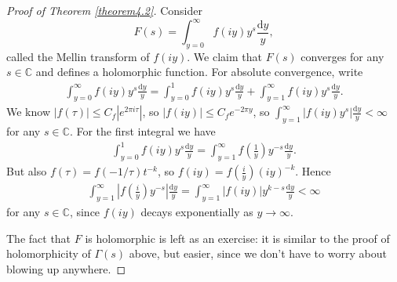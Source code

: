 \documentclass{article}
\theoremstyle{definition}
\begin{document}
\begin{proof}[Proof of Theorem \ref{theorem4.2}]
    Consider \[
    F(s) = \int_{y=0}^{\infty} f(iy)y^s\frac{\mathrm{d}y}{y},
    \]
    called the Mellin transform of $f(iy)$. We claim that $F(s)$ converges for any $s \in \mathbb{C}$ and defines a holomorphic function. For absolute convergence, write
    \begin{align*}
        \int_{y=0}^{\infty} f(iy)y^s\frac{\mathrm{d}y}{y} = \int_{y=0}^{1} f(iy)y^s \frac{\mathrm{d}y}{y} + \int_{y=1}^{\infty} f(iy)y^s \frac{\mathrm{d}y}{y}.
    \end{align*}
    We know $|f(\tau)|\le C_f|e^{2\pi i \tau}|$, so $ |f(iy)| \le C_f e^{-2\pi y}$, so $\int_{y=1}^{\infty} |f(iy)y^s|\frac{\mathrm{d}y}{y} < \infty$ for any $s \in \mathbb{C}$. For the first integral we have 
    \begin{align*}
        \int_{y=0}^{1} f(iy)y^s \frac{\mathrm{d}y}{y} = \int_{y=1}^{\infty} f \left(\frac{1}{y}\right)y^{-s}\frac{\mathrm{d}y}{y}.
    \end{align*}
    But also $f(\tau) = f(-1/\tau)t^{-k}$, so $f(iy) = f\left(\frac{i}{y}\right) (iy)^{-k}$. Hence
    \begin{align*}
        \int_{y=1}^{\infty} \left|f \left(\frac{i}{y}\right) y^{-s}\right| \frac{\mathrm{d}y}{y} = \int_{y=1}^{\infty}  |f(iy)|y^{k-s} \frac{\mathrm{d}y}{y}<\infty
    \end{align*}
    for any $s \in \mathbb{C}$, since $f(iy)$ decays exponentially as $y \to \infty$.
    \vspace{1mm}
     
    The fact that $F$ is holomorphic is left as an exercise: it is similar to the proof of holomorphicity of $\Gamma(s)$ above, but easier, since we don't have to worry about blowing up anywhere.
    \vspace{1mm}
     

\end{proof}
\end{document}

